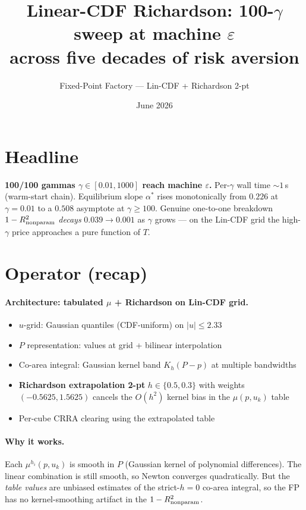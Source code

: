 \documentclass[11pt]{article}
\title{Linear-CDF Richardson: 100-$\gamma$ sweep at machine $\varepsilon$\\
       across five decades of risk aversion}
\author{Fixed-Point Factory --- Lin-CDF + Richardson 2-pt}
\date{June 2026}
\begin{document}
\maketitle

\section*{Headline}

\textbf{100/100 gammas $\gamma \in [0.01, 1000]$ reach machine
$\varepsilon$.} Per-$\gamma$ wall time $\sim 1$\,s (warm-start chain).
Equilibrium slope $\alpha^*$ rises monotonically from $0.226$ at
$\gamma{=}0.01$ to a $0.508$ asymptote at $\gamma{\geq}100$. Genuine
one-to-one breakdown $1-R^2_{\rm nonparam}$ \emph{decays}
$0.039 \to 0.001$ as $\gamma$ grows --- on the Lin-CDF grid the
high-$\gamma$ price approaches a pure function of $T$.

\section{Operator (recap)}

\paragraph{Architecture: tabulated $\mu$ + Richardson on Lin-CDF grid.}
\begin{itemize}
  \item $u$-grid: Gaussian quantiles (CDF-uniform) on $|u|\!\leq\!2.33$
  \item $P$ representation: values at grid + bilinear interpolation
  \item Co-area integral: Gaussian kernel band $K_h(P-p)$ at multiple
        bandwidths
  \item \textbf{Richardson extrapolation 2-pt} $h \in \{0.5, 0.3\}$
        with weights $(-0.5625, 1.5625)$ cancels the $O(h^2)$ kernel bias
        in the $\mu(p, u_k)$ table
  \item Per-cube CRRA clearing using the extrapolated table
\end{itemize}

\paragraph{Why it works.} Each $\mu^{h_i}(p, u_k)$ is smooth in $P$
(Gaussian kernel of polynomial differences). The linear combination is
still smooth, so Newton converges quadratically. But the \emph{table
values} are unbiased estimates of the strict-$h{=}0$ co-area integral,
so the FP has no kernel-smoothing artifact in the $1-R^2_{\rm nonparam}$.
\end{document}
